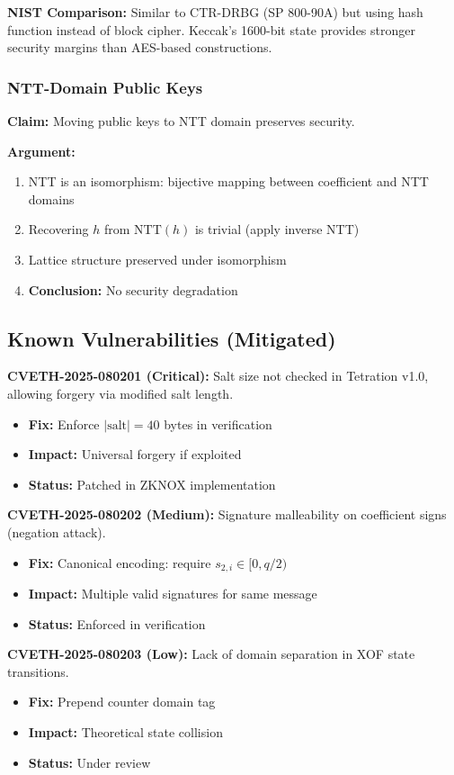 \textbf{NIST Comparison:} Similar to CTR-DRBG (SP 800-90A) but using hash function instead of block cipher. Keccak's 1600-bit state provides stronger security margins than AES-based constructions.

\subsubsection{NTT-Domain Public Keys}

\textbf{Claim:} Moving public keys to NTT domain preserves security.

\textbf{Argument:}
\begin{enumerate}
    \item NTT is an isomorphism: bijective mapping between coefficient and NTT domains
    \item Recovering $h$ from $\text{NTT}(h)$ is trivial (apply inverse NTT)
    \item Lattice structure preserved under isomorphism
    \item \textbf{Conclusion:} No security degradation
\end{enumerate}

\subsection{Known Vulnerabilities (Mitigated)}

\textbf{CVETH-2025-080201 (Critical):} Salt size not checked in Tetration v1.0, allowing forgery via modified salt length.
\begin{itemize}
    \item \textbf{Fix:} Enforce $|\text{salt}| = 40$ bytes in verification
    \item \textbf{Impact:} Universal forgery if exploited
    \item \textbf{Status:} Patched in ZKNOX implementation
\end{itemize}

\textbf{CVETH-2025-080202 (Medium):} Signature malleability on coefficient signs (negation attack).
\begin{itemize}
    \item \textbf{Fix:} Canonical encoding: require $s_{2,i} \in [0, q/2)$
    \item \textbf{Impact:} Multiple valid signatures for same message
    \item \textbf{Status:} Enforced in verification
\end{itemize}

\textbf{CVETH-2025-080203 (Low):} Lack of domain separation in XOF state transitions.
\begin{itemize}
    \item \textbf{Fix:} Prepend counter domain tag
    \item \textbf{Impact:} Theoretical state collision
    \item \textbf{Status:} Under review
\end{itemize}

